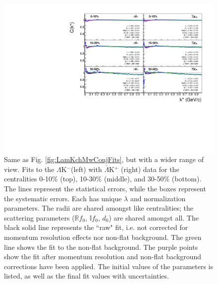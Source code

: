 \documentclass[../AnalysisNoteJBuxton.tex]{subfiles}
\begin{document}
\begin{figure}[h]
  \centering
  \includegraphics[width=\textwidth]{7_ResultsAndDiscussion/Figures/canKStarCfwFitsLamKchMwConj_0010_1030_3050UnZoomed_MomResCrctn_NonFlatBgdCrctn.pdf}
  \caption[$\Lambda$K$^{-}$($\bar{\Lambda}$K$^{+}$) Fits (Wide Range)]{Same as Fig. \ref{fig:LamKchMwConjFits}, but with a wider range of view.
Fits to the $\Lambda$K$^{-}$(left) with $\bar{\Lambda}$K$^{+}$ (right) data for the centralities 0-10\% (top), 10-30\% (middle), and 30-50\% (bottom).
The lines represent the statistical errors, while the boxes represent the systematic errors.  
Each has unique $\lambda$ and normalization parameters.
The radii are shared amongst like centralities; the scattering parameters ($\mathbb{R}f_{0}$, $\mathbb{I}f_{0}$, $d_{0}$) are shared amongst all.
The black solid line represents the ``raw" fit, i.e. not corrected for momentum resolution effects nor non-flat background.  
The green line shows the fit to the non-flat background.
The purple points show the fit after momentum resolution and non-flat background corrections have been applied.
The initial values of the parameters is listed, as well as the final fit values with uncertainties.}
  \label{fig:LamKchMwConjFitsUnZoomed}
\end{figure}
\end{document}
